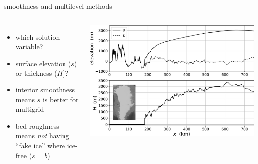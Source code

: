 \documentclass[usepdftitle=false,usenames,dvipsnames]{beamer}
\begin{document}
\begin{frame}{smoothness and multilevel methods}

\begin{columns}
    \begin{itemize}
    \small
    \item which solution variable?
    \item surface elevation ($s$) or thickness ($H$)?
    \item interior smoothness means $s$ is better for multigrid
    \item bed roughness means \emph{not} having ``fake ice'' where ice-free ($s=b$)
    \end{itemize}
    \includegraphics[width=\textwidth]{figs/giscross.png}
\end{columns}
\end{frame}
\end{document}

